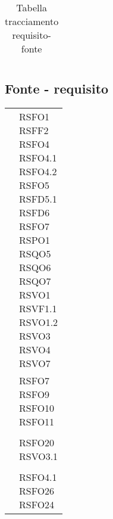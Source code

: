 {{{{{\begin{center}
\begin{longtable}{|p{7.5cm}|p{7.5cm}|}
		\caption[Tabella tracciamento requisito-fonte]{Tabella tracciamento requisito-fonte}\label{4.5}\\
	\end{longtable}
\end{center}
\clearpage

\subsection{Fonte - requisito}\label{RequisitiTracciamentoDeiRequisitiFonteRequisito}
\def\tabularxcolumn#1{m{#1}}
{
	\begin{center}
		\renewcommand{\arraystretch}{1.4}
		\begin{longtable}{|p{7.5cm}|p{7.5cm}|}
		\hline
		\rowcolor{airforceblue}
		\makecell[c]{\textbf{Fonte}} & \makecell[c]{\textbf{Codice RS}}  \\
		\hline
		\makecell[c]{Capitolato$_{\scaleto{G}{3pt}}$} & \makecell[c]{RSFO1\\RSFF2\\RSFO4\\RSFO4.1\\RSFO4.2\\RSFO5\\RSFD5.1\\RSFD6\\RSFO7\\RSPO1\\RSQO5\\RSQO6\\RSQO7\\RSVO1\\RSVF1.1\\RSVO1.2\\RSVO3\\RSVO4\\RSVO7} \\
		\hline
		\makecell[c]{UC1} & \makecell[c]{RSFO7 \\ RSFO9 \\ RSFO10 \\ RSFO11} \\
		\hline
		\makecell[c]{UC2} & \makecell[c]{RSFO3} \\
		\hline
		\makecell[c]{UC4} & \makecell[c]{RSFO20 \\ RSVO3.1 } \\ %
		\hline
		\makecell[c]{UC5} & \makecell[c]{RSFO4} \\
		\hline
		\makecell[c]{UC5.1} & \makecell[c]{RSFO4.1 \\ RSFO26 \\ RSFO24} \\

\end{longtable}
\end{center}}}}}}}
